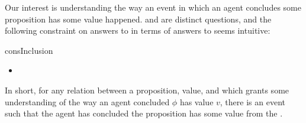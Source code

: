 \begin{note}
  Our interest is understanding the way an event in which an agent concludes some proposition has some value happened.
  \qWhy{} and \qHow{} are distinct questions, and the following constraint on answers to \qWhy{} in terms of answers to \qHow{} seems intuitive:

  \begin{constraint}{consInclusion}{\issueInclusion{}}
    \mbox{ }
    \vspace{-\baselineskip}
    \begin{itemize}
    \item
  \end{itemize}
  \vspace{-\baselineskip}
  \end{constraint}

  In short, for any relation between a proposition, value, and \pool{} which grants some understanding of the way an agent concluded \(\phi\) has value \(v\), there is an event such that the agent has concluded the proposition has some value from the \pool{}.
\end{note}

